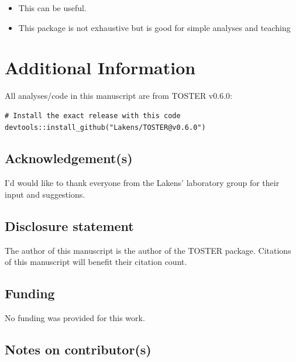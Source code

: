 \documentclass[]{interact}
\theoremstyle{plain}%
\theoremstyle{definition}
\theoremstyle{remark}
\providecommand{\tightlist}{%
  \setlength{\itemsep}{0pt}\setlength{\parskip}{0pt}}
\def\tightlist{}
\begin{document}
\begin{itemize}
\tightlist
\item
  This can be useful.
\item
  This package is not exhaustive but is good for simple analyses and
  teaching
\end{itemize}

\newpage

\hypertarget{additional-information}{%
\section{Additional Information}\label{additional-information}}

All analyses/code in this manuscript are from TOSTER v0.6.0:

\begin{verbatim}
# Install the exact release with this code
devtools::install_github("Lakens/TOSTER@v0.6.0")
\end{verbatim}

\hypertarget{acknowledgements}{%
\subsection*{Acknowledgement(s)}\label{acknowledgements}}

I'd would like to thank everyone from the Lakens' laboratory group for
their input and suggestions.

\hypertarget{disclosure-statement}{%
\subsection*{Disclosure statement}\label{disclosure-statement}}

The author of this manuscript is the author of the TOSTER package.
Citations of this manuscript will benefit their citation count.

\hypertarget{funding}{%
\subsection*{Funding}\label{funding}}

No funding was provided for this work.

\hypertarget{notes-on-contributors}{%
\subsection*{Notes on contributor(s)}\label{notes-on-contributors}}
\end{document}
